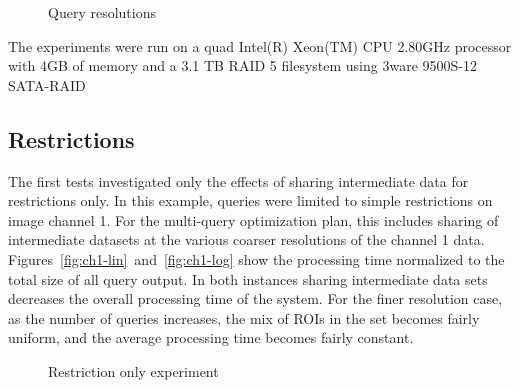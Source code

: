\documentclass{ucdthesis}       %
\begin{document}
\begin{figure}[htb]
  \centering
  \caption{Query resolutions}
  \label{fig:resolution}
\end{figure}


The experiments were run on a quad Intel(R) Xeon(TM) CPU
2.80GHz processor with 4GB of memory and a 3.1 TB RAID 5 filesystem
using 3ware 9500S-12 SATA-RAID



%     
%       

\subsection{Restrictions}

The first tests investigated only the effects of sharing intermediate
data for restrictions only.  In this example, queries were limited
to simple restrictions on image channel 1.  For the multi-query
optimization plan, this includes sharing of intermediate datasets at
the various coarser resolutions of the channel 1 data.
Figures~\ref{fig:ch1-lin}~and~\ref{fig:ch1-log} show the processing
time normalized to the total size of all query output.  In both
instances sharing intermediate data sets decreases the overall
processing time of the system.  For the finer resolution case, as the
number of queries increases, the mix of \acp{ROI} in the set becomes
fairly uniform, and the average processing time becomes fairly
constant.

\begin{figure}[htb]
  \centering
  \caption{Restriction only experiment}
  \label{fig:ch1-lin-log}
\end{figure}
\end{document}
